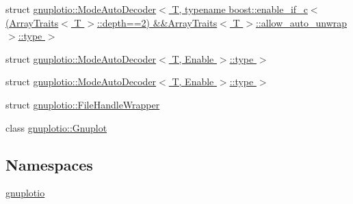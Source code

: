 \begin{DoxyCompactItemize}
struct \hyperlink{structgnuplotio_1_1_mode_auto_decoder_3_01_t_00_01typename_01boost_1_1enable__if__c_3_07_array_t4ce8ac95d6c3a0ceeea993ff675b3872}{gnuplotio\+::\+Mode\+Auto\+Decoder$<$ T, typename boost\+::enable\+\_\+if\+\_\+c$<$(\+Array\+Traits$<$ T $>$\+::depth==2) \&\&\+Array\+Traits$<$ T $>$\+::allow\+\_\+auto\+\_\+unwrap $>$\+::type $>$}
\item 
struct \hyperlink{structgnuplotio_1_1_mode_auto_decoder_1_1type_01_4}{gnuplotio\+::\+Mode\+Auto\+Decoder$<$ T, Enable $>$\+::type $>$}
\item 
struct \hyperlink{structgnuplotio_1_1_mode_auto_decoder_1_1type_01_4}{gnuplotio\+::\+Mode\+Auto\+Decoder$<$ T, Enable $>$\+::type $>$}
\item 
struct \hyperlink{structgnuplotio_1_1_file_handle_wrapper}{gnuplotio\+::\+File\+Handle\+Wrapper}
\item 
class \hyperlink{classgnuplotio_1_1_gnuplot}{gnuplotio\+::\+Gnuplot}
\end{DoxyCompactItemize}
\subsection*{Namespaces}
\begin{DoxyCompactItemize}
\item 
 \hyperlink{namespacegnuplotio}{gnuplotio}
\end{DoxyCompactItemize}
